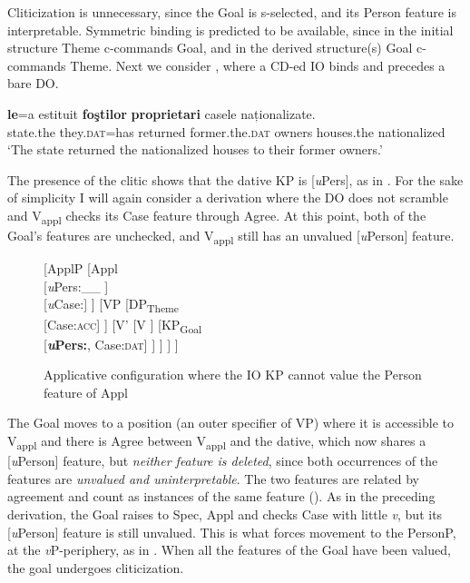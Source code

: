 \documentclass[output=paper,colorlinks,citecolor=brown,nonflat]{langsci/langscibook}
\begin{document}
Cliticization is unnecessary, since the Goal is s-selected, and its Person feature is interpretable. Symmetric binding is predicted to be available, since in the initial structure Theme c-commands Goal, and in the derived structure(s) Goal c-commands Theme. Next we consider , where a CD-ed IO binds and precedes a bare DO.

\ea%
 \label{ex:cornilescu:26}
  \textbf{le}=a {estituit} \textbf{foştilor} \textbf{proprietari} {casele} {naționalizate}.\\
 state.the they.\textsc{dat}=has returned former.the.\textsc{dat} owners houses.the nationalized\\
 \glt ‘The state returned the nationalized houses to their former owners.’
 \z

The presence of the clitic shows that the dative KP is [\textit{u}Pers], as in . For the sake of simplicity I will again consider a derivation where the DO does not scramble and V\textsubscript{appl} checks its Case feature through Agree. At this point, both of the Goal’s features are unchecked, and V\textsubscript{appl} still has an unvalued [\textit{u}Person] feature.

\begin{figure}%
	\begin{forest}
		[ApplP
			[Appl\\
				{[}\textit{u}Pers:\_\_ {]}\\
				{[}\textit{u}Case:{\longrule}{]}
			]
			[VP
				[DP\textsubscript{Theme} \\
				 {[}Case:\textsc{acc}{]}
				]
				[V'
					[V
					]
					[KP\textsubscript{Goal}\\{[}\textbf{\textit{u}Pers:{\longrule}}{,} Case:\textsc{dat}{]}
					]
				]
			]
		]
	\end{forest}
	\caption{\label{fig:cornilescu:9} Applicative configuration where the IO KP cannot value the Person feature of Appl}
\end{figure}


The Goal moves to a position (an outer specifier of VP) where it is accessible to V\textsubscript{appl} and there is Agree between V\textsubscript{appl} and the dative, which now shares a [\textit{u}Person] feature, but \textit{neither feature is deleted}, since both occurrences of the features are \textit{unvalued and uninterpretable}. The two features are related by agreement and count as instances of the same feature (\citealt{PesetskyTorrego2007}). As in the preceding derivation, the Goal raises to Spec, Appl and checks Case with little \textit{v}, but its [\textit{u}Person] feature is still unvalued. This is what forces movement to the PersonP, at the  \textit{v}P-periphery, as in . When all the features of the Goal have been valued, the goal undergoes cliticization.
\end{document}
